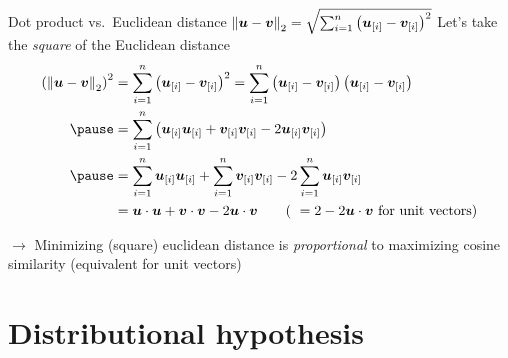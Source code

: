 \documentclass[12pt,aspectratio=169,handout]{beamer}
\begin{document}
\begin{frame}{Dot product vs.\ Euclidean distance $\norm{\bm{u} - \bm{v}}_{2} = \sqrt{\sum_{i = 1}^{n} \left( \bm{u}_{[i]} - \bm{v}_{[i]} \right)^2}$}
Let's take the \emph{square} of the Euclidean distance
	$$
	\begin{aligned}
		\left(\norm{\bm{u} - \bm{v}}_{2}\right)^2 &=
		\sum_{i = 1}^{n} \left( \bm{u}_{[i]} - \bm{v}_{[i]} \right)^2 
		=
		\sum_{i = 1}^{n} \left( \bm{u}_{[i]} - \bm{v}_{[i]} \right) \left( \bm{u}_{[i]} - \bm{v}_{[i]} \right) \\ \pause
		&=
		\sum_{i = 1}^{n} \left( \bm{u}_{[i]} \bm{u}_{[i]} + \bm{v}_{[i]} \bm{v}_{[i]} - 2 \bm{u}_{[i]} \bm{v}_{[i]} \right)  \\ \pause
		&= \sum_{i = 1}^{n}  \bm{u}_{[i]} \bm{u}_{[i]} + \sum_{i = 1}^{n} \bm{v}_{[i]} \bm{v}_{[i]} - 2 \sum_{i = 1}^{n} \bm{u}_{[i]} \bm{v}_{[i]} \\
		&= \bm{u} \cdot \bm{u} + \bm{v} \cdot \bm{v} - 2 \bm{u} \cdot \bm{v} \qquad
		\text{( } = 2 - 2 \bm{u} \cdot \bm{v} \text{ for unit vectors)}\\
	\end{aligned}
	$$
	
	\pause
	
$\to$ Minimizing (square) euclidean distance is \emph{proportional} to maximizing cosine similarity (equivalent for unit vectors)

	
	
\end{frame}


\section{Distributional hypothesis}
\end{document}
